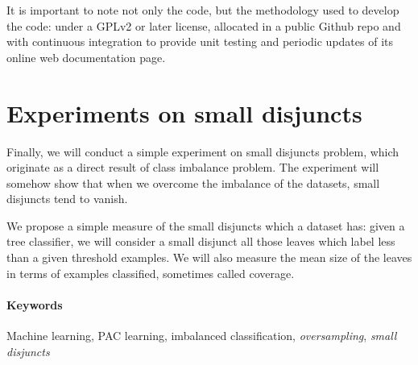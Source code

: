 It is important to note not only the code, but the methodology used to develop the code: under a GPLv2 or later license,
allocated in a public Github repo and with continuous integration to provide unit testing and periodic updates of
its online web documentation page.

\section*{Experiments on small disjuncts}
Finally, we will conduct a simple experiment on small disjuncts problem, which originate as a direct result of class imbalance
problem. The experiment will somehow show that when we overcome the imbalance of the datasets, small disjuncts tend to
vanish.

We propose a simple measure of the small disjuncts which a dataset has: given a tree classifier, we will consider a small
disjunct all those leaves which label less than a given threshold examples. We will also measure the mean size of the 
leaves in terms of examples classified, sometimes called coverage.

\paragraph{Keywords}
Machine learning, PAC learning, imbalanced classification, \textit{oversampling}, \textit{small disjuncts}